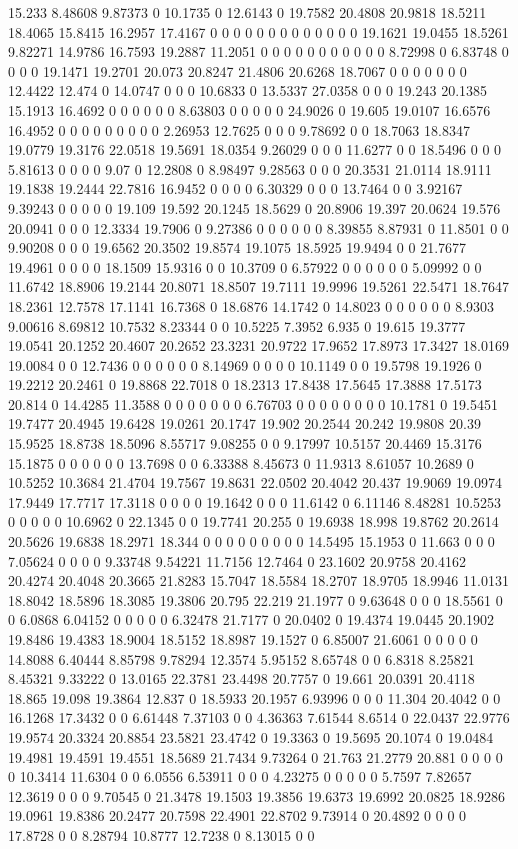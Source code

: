 15.233 8.48608 9.87373 0 10.1735 0 12.6143 0 19.7582 20.4808 20.9818 18.5211 18.4065 15.8415 16.2957 17.4167 0 0 0 0 0 0 0 0 0 0 0 0 0 19.1621 19.0455 18.5261 9.82271 14.9786 16.7593 19.2887 11.2051 0 0 0 0 0 0 0 0 0 0 0 8.72998 0 6.83748 0 0 0 0 19.1471 19.2701 20.073 20.8247 21.4806 20.6268 18.7067 0 0 0 0 0 0 0 12.4422 12.474 0 14.0747 0 0 0 10.6833 0 13.5337 27.0358 0 0 0 19.243 20.1385 15.1913 16.4692 0 0 0 0 0 0 8.63803 0 0 0 0 0 24.9026 0 19.605 19.0107 16.6576 16.4952 0 0 0 0 0 0 0 0 0 2.26953 12.7625 0 0 0 9.78692 0 0 18.7063 18.8347 19.0779 19.3176 22.0518 19.5691 18.0354 9.26029 0 0 0 11.6277 0 0 18.5496 0 0 0 5.81613 0 0 0 0 9.07 0 12.2808 0 8.98497 9.28563 0 0 0 20.3531 21.0114 18.9111 19.1838 19.2444 22.7816 16.9452 0 0 0 0 6.30329 0 0 0 13.7464 0 0 3.92167 9.39243 0 0 0 0 0 19.109 19.592 20.1245 18.5629 0 20.8906 19.397 20.0624 19.576 20.0941 0 0 0 12.3334 19.7906 0 9.27386 0 0 0 0 0 0 8.39855 8.87931 0 11.8501 0 0 9.90208 0 0 0 19.6562 20.3502 19.8574 19.1075 18.5925 19.9494 0 0 21.7677 19.4961 0 0 0 0 18.1509 15.9316 0 0 10.3709 0 6.57922 0 0 0 0 0 0 5.09992 0 0 11.6742 18.8906 19.2144 20.8071 18.8507 19.7111 19.9996 19.5261 22.5471 18.7647 18.2361 12.7578 17.1141 16.7368 0 18.6876 14.1742 0 14.8023 0 0 0 0 0 0 8.9303 9.00616 8.69812 10.7532 8.23344 0 0 10.5225 7.3952 6.935 0 19.615 19.3777 19.0541 20.1252 20.4607 20.2652 23.3231 20.9722 17.9652 17.8973 17.3427 18.0169 19.0084 0 0 12.7436 0 0 0 0 0 0 8.14969 0 0 0 0 10.1149 0 0 19.5798 19.1926 0 19.2212 20.2461 0 19.8868 22.7018 0 18.2313 17.8438 17.5645 17.3888 17.5173 20.814 0 14.4285 11.3588 0 0 0 0 0 0 0 6.76703 0 0 0 0 0 0 0 0 10.1781 0 19.5451 19.7477 20.4945 19.6428 19.0261 20.1747 19.902 20.2544 20.242 19.9808 20.39 15.9525 18.8738 18.5096 8.55717 9.08255 0 0 9.17997 10.5157 20.4469 15.3176 15.1875 0 0 0 0 0 0 13.7698 0 0 6.33388 8.45673 0 11.9313 8.61057 10.2689 0 10.5252 10.3684 21.4704 19.7567 19.8631 22.0502 20.4042 20.437 19.9069 19.0974 17.9449 17.7717 17.3118 0 0 0 0 19.1642 0 0 0 11.6142 0 6.11146 8.48281 10.5253 0 0 0 0 0 10.6962 0 22.1345 0 0 19.7741 20.255 0 19.6938 18.998 19.8762 20.2614 20.5626 19.6838 18.2971 18.344 0 0 0 0 0 0 0 0 0 14.5495 15.1953 0 11.663 0 0 0 7.05624 0 0 0 0 9.33748 9.54221 11.7156 12.7464 0 23.1602 20.9758 20.4162 20.4274 20.4048 20.3665 21.8283 15.7047 18.5584 18.2707 18.9705 18.9946 11.0131 18.8042 18.5896 18.3085 19.3806 20.795 22.219 21.1977 0 9.63648 0 0 0 18.5561 0 0 6.0868 6.04152 0 0 0 0 0 6.32478 21.7177 0 20.0402 0 19.4374 19.0445 20.1902 19.8486 19.4383 18.9004 18.5152 18.8987 19.1527 0 6.85007 21.6061 0 0 0 0 0 14.8088 6.40444 8.85798 9.78294 12.3574 5.95152 8.65748 0 0 6.8318 8.25821 8.45321 9.33222 0 13.0165 22.3781 23.4498 20.7757 0 19.661 20.0391 20.4118 18.865 19.098 19.3864 12.837 0 18.5933 20.1957 6.93996 0 0 0 11.304 20.4042 0 0 16.1268 17.3432 0 0 6.61448 7.37103 0 0 4.36363 7.61544 8.6514 0 22.0437 22.9776 19.9574 20.3324 20.8854 23.5821 23.4742 0 19.3363 0 19.5695 20.1074 0 19.0484 19.4981 19.4591 19.4551 18.5689 21.7434 9.73264 0 21.763 21.2779 20.881 0 0 0 0 0 10.3414 11.6304 0 0 6.0556 6.53911 0 0 0 4.23275 0 0 0 0 0 5.7597 7.82657 12.3619 0 0 0 9.70545 0 21.3478 19.1503 19.3856 19.6373 19.6992 20.0825 18.9286 19.0961 19.8386 20.2477 20.7598 22.4901 22.8702 9.73914 0 20.4892 0 0 0 0 17.8728 0 0 8.28794 10.8777 12.7238 0 8.13015 0 0 